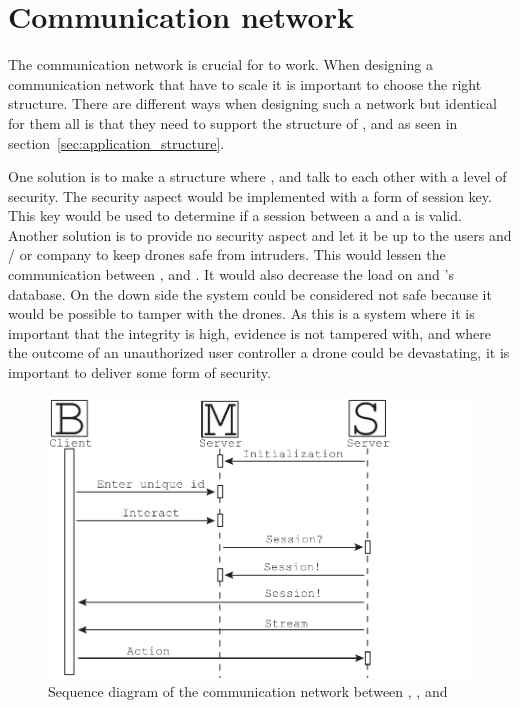 \section{Communication network}

The communication network is crucial for \projectname{} to work.
When designing a communication network that have to scale it is important to choose the right structure.
There are different ways when designing such a network but identical for them all is that they need to support the structure of ,  and  as seen in section~\ref{sec:application_structure}.

One solution is to make a structure where ,  and  talk to each other with a level of security. 
The security aspect would be implemented with a form of session key. 
This key would be used to determine if a session between a  and a  is valid.
Another solution is to provide no security aspect and let it be up to the users and / or company to keep drones safe from intruders.
This would lessen the communication between ,  and .  
It would also decrease the load on  and 's database. 
On the down side the system could be considered not safe because it would be possible to tamper with the drones.
As this is a system where it is important that the integrity is high, evidence is not tampered with, and where the outcome of an unauthorized user controller a drone could be devastating, it is important to deliver some form of security.

\begin{figure}[!h]
    \centering 
    \includegraphics[width=\textwidth]{gfx/sequence_diagram.pdf}
    \caption{Sequence diagram of the communication network between , , and }
    \label{fig:sequence_diagram}
\end{figure}

